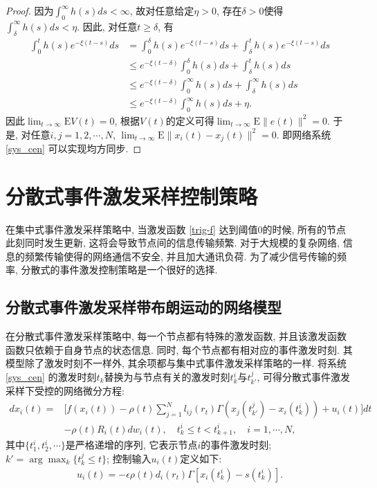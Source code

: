 \begin{proof}
        因为$\int_0^\infty h(s)ds<\infty$, 故对任意给定$\eta>0$, 存在$\delta>0$使得$\int_{\delta}^\infty h(s)ds<\eta$. 因此, 对任意$t\geq\delta$, 有
        \begin{align*}
        \nonumber\int_0^th(s)e^{-\xi(t-s)}ds&=\int_0^\delta h(s)e^{-\xi(t-s)}ds+\int_\delta^th(s)e^{-\xi(t-s)}ds\\
        \nonumber&\leq e^{-\xi(t-\delta)}\int_0^\delta h(s)ds+\int_\delta^th(s)ds\\
        \nonumber&\leq e^{-\xi(t-\delta)}\int_0^\infty h(s)ds+\int_\delta^\infty h(s)ds\\
        &\leq e^{-\xi(t-\delta)}\int_0^\infty h(s)ds+\eta.
        \end{align*}
        因此$\lim_{t\rightarrow\infty}\mathrm{E}V(t)=0$, 根据$V(t)$的定义可得$\lim_{t\rightarrow\infty}\mathrm{E}\|e(t)\|^2=0$. 于是, 对任意$i, j=1,2,\cdots,N$, $\lim_{t\rightarrow\infty}\mathrm{E}\|x_i(t)-x_j(t)\|^2=0$. 即网络系统 \eqref{sys_cen} 可以实现均方同步.
        \end{proof}

\section{分散式事件激发采样控制策略}\label{decentralized}
        在集中式事件激发采样策略中, 当激发函数 \eqref{trig-f} 达到阈值$0$的时候, 所有的节点此刻同时发生更新, 这将会导致节点间的信息传输频繁. 对于大规模的复杂网络, 信息的频繁传输使得的网络通信不安全, 并且加大通讯负荷. 为了减少信号传输的频率, 分散式的事件激发控制策略是一个很好的选择.
\subsection{分散式事件激发采样带布朗运动的网络模型}
        在分散式事件激发采样策略中, 每一个节点都有特殊的激发函数, 并且该激发函数函数只依赖于自身节点的状态信息. 同时, 每个节点都有相对应的事件激发时刻. 其模型除了激发时刻不一样外, 其余项都与集中式事件激发采样策略的一样. 将系统 \eqref{sys_cen} 的激发时刻$t_k$替换为与节点有关的激发时刻$t^i_{k}$与$t^j_{k'}$, 可得分散式事件激发采样下受控的网络微分方程:
        \begin{align}\label{sys_decen}
        \nonumber dx_{i}(t)=&\Big[f(x_{i}(t))-\rho(t)\sum^N_{j=1}l_{ij}(r_{t})\Gamma(x_{j}(t^j_{k'})-x_{i}(t^i_{k}))+u_i(t)\Big]dt\\
         &-\rho(t)R_i(t)dw_{i}(t),\quad t^i_{k}\leq t< t^i_{k+1}, \quad i = 1,\cdots,N,
        \end{align}
       其中$\{t^i_{1},t^i_{2},\cdots \}$是严格递增的序列, 它表示节点$i$的事件激发时刻; $k'=\arg\max_k\{t^j_k\leq t\}$; 控制输入$u_i(t)$定义如下:
        \begin{align*}
            u_i(t)=-\epsilon\rho(t)d_{i}(r_{t})\Gamma[x_{i}(t^i_{k})-s(t^i_{k})].
        \end{align*}

